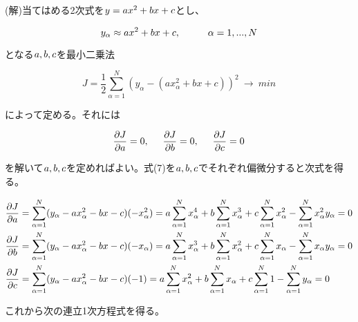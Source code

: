 \documentclass[a4]{jarticle}
\begin{document}
(解)当てはめる2次式を${\sl y = ax^2 + bx +c}$とし、

\begin{equation}
y_\alpha \approx ax^2 + bx +c, \hspace{10truemm} \alpha = 1,...,N
\end{equation}

となる${\sl a,b,c}$を最小二乗法

\begin{equation}
J = \frac{1}{2}\sum_{\alpha = 1}^{N}(y_\alpha - (ax^2_\alpha + bx + c))^2 \  \to \ min
\end{equation}

によって定める。それには

\begin{equation}
\frac{\partial J}{\partial a} = 0,\hspace{5truemm} \frac{\partial J}{\partial b} = 0,\hspace{5truemm}\frac{\partial J}{\partial c} = 0
\end{equation}

を解いて${\sl a,b,c}$を定めればよい。式(7)を${\sl a,b,c}$でそれぞれ偏微分すると次式を得る。

\begin{eqnarray}
\frac{\partial J}{\partial a} = \sum_{\alpha = 1}^{N}(y_\alpha - ax^2_\alpha - bx -c)(-x^2_\alpha) = a\sum_{\alpha = 1}^{N}x^4_\alpha + b\sum_{\alpha = 1}^{N}x^3_\alpha + c\sum_{\alpha = 1}^{N}x^2_\alpha - \sum_{\alpha = 1}^{N}x^2_\alpha y_\alpha = 0 \nonumber \\
\frac{\partial J}{\partial b} = \sum_{\alpha = 1}^{N}(y_\alpha - ax^2_\alpha - bx -c)(-x_\alpha) = a\sum_{\alpha = 1}^{N}x^3_\alpha + b\sum_{\alpha = 1}^{N}x^2_\alpha + c\sum_{\alpha = 1}^{N}x_\alpha - \sum_{\alpha = 1}^{N}x_\alpha y_\alpha = 0 \nonumber \\
\frac{\partial J}{\partial c} = \sum_{\alpha = 1}^{N}(y_\alpha - ax^2_\alpha - bx -c)(-1) = a\sum_{\alpha = 1}^{N}x^2_\alpha + b\sum_{\alpha = 1}^{N}x_\alpha + c\sum_{\alpha = 1}^{N}1 - \sum_{\alpha = 1}^{N}y_\alpha = 0 \hspace{8.5truemm} 
\end{eqnarray}


これから次の連立1次方程式を得る。
\end{document}
